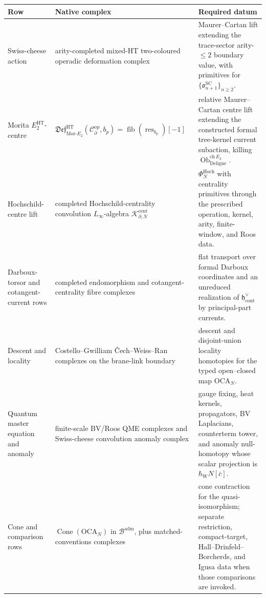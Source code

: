\documentclass[11pt]{memoir}
\begin{document}
  \begin{center}
  \footnotesize
  \renewcommand{\arraystretch}{1.15}
  \begin{tabularx}{\textwidth}{@{}>{\raggedright\arraybackslash}p{}
    >{\raggedright\arraybackslash}p{}
    >{\raggedright\arraybackslash}X@{}}
    \textbf{Row} & \textbf{Native complex} & \textbf{Required datum}\\\hline
    Swiss-cheese action &
      arity-completed mixed-HT two-coloured operadic deformation complex &
      Maurer--Cartan lift extending the trace-sector arity-\(\le2\)
      boundary value, with primitives for
      \(\{\mathfrak o^{\mathrm{SC}}_{n+1}\}_{n\ge2}\).\\
	    Morita \(E_2^{\mathrm{HT}}\)-centre &
	      \(\mathfrak{Def}^{\mathrm{HT}}_{\mathrm{Mor}\mbox{-}E_2}
	      (\mathcal C^{\mathrm{op}}_\partial,b_p)
	      =\operatorname{fib}(\operatorname{res}_{b_p})[-1]\) &
	      relative Maurer--Cartan centre lift extending the constructed
	      formal tree-kernel current subaction, killing
	      \(\operatorname{Ob}^{\mathrm{ch}\,E_2}_{\mathrm{Deligne}}\).\\
    Hochschild-centre lift &
      completed Hochschild-centrality convolution \(L_\infty\)-algebra
      \(\mathcal K^{\mathrm{cent}}_{\partial,N}\) &
      \(\Phi_N^{\mathrm{Hoch}}\) with centrality primitives through the
      prescribed operation, kernel, arity, finite-window, and Roos data.\\
    Darboux-torsor and cotangent-current rows &
      completed endomorphism and cotangent-centrality fibre complexes &
      flat transport over formal Darboux coordinates and an unreduced
      realization of \(\mathfrak h^\vee_{\mathrm{cont}}\) by principal-part
      currents.\\
    Descent and locality &
      Costello--Gwilliam \v{C}ech--Weiss--Ran complexes on the brane-link
      boundary &
      descent and disjoint-union locality homotopies for the typed
      open--closed map \(\mathrm{OCA}_N\).\\
    Quantum master equation and anomaly &
      finite-scale BV/Roos QME complexes and Swiss-cheese convolution
      anomaly complex &
      gauge fixing, heat kernels, propagators, BV Laplacians,
      counterterm tower, and anomaly null-homotopy whose scalar projection
      is \(\hbar_{\mathrm{W}}N[\bar c]\).\\
    Cone and comparison rows &
      \(\operatorname{Cone}(\mathrm{OCA}_N)\) in
      \(\mathcal B^{\mathrm{adm}}\), plus matched-conventions complexes &
      cone contraction for the quasi-isomorphism; separate restriction,
      compact-target, Hall--Drinfeld--Borcherds, and Igusa data when those
      comparisons are invoked.
	  \end{tabularx}
	  \end{center}
\end{document}
